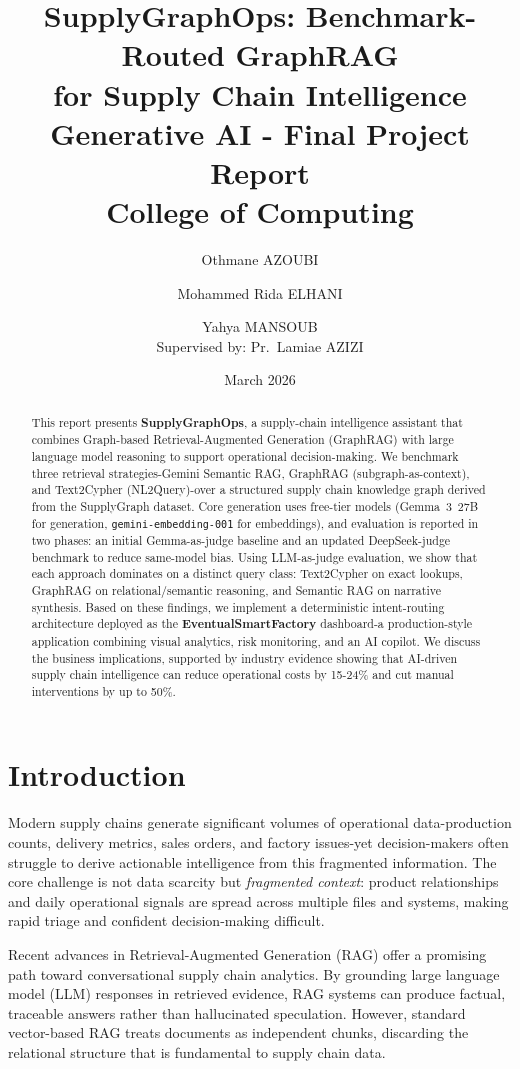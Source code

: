 \documentclass[11pt,a4paper]{article}
\title{
  \textbf{SupplyGraphOps: Benchmark-Routed GraphRAG\\for Supply Chain Intelligence}\\[6pt]
  \large Generative AI - Final Project Report\\
  College of Computing
}
\author{
  Othmane AZOUBI \and Mohammed Rida ELHANI \and Yahya MANSOUB\\[6pt]
  \normalsize Supervised by: Pr.\ Lamiae AZIZI
}
\date{March 2026}
\begin{document}
\maketitle
\thispagestyle{fancy}

\begin{abstract}
This report presents \textbf{SupplyGraphOps}, a supply-chain intelligence assistant that combines Graph-based Retrieval-Augmented Generation (GraphRAG) with large language model reasoning to support operational decision-making. We benchmark three retrieval strategies-Gemini Semantic RAG, GraphRAG (subgraph-as-context), and Text2Cypher (NL2Query)-over a structured supply chain knowledge graph derived from the SupplyGraph dataset. Core generation uses free-tier models (Gemma~3~27B for generation, \texttt{gemini-embedding-001} for embeddings), and evaluation is reported in two phases: an initial Gemma-as-judge baseline and an updated DeepSeek-judge benchmark to reduce same-model bias. Using LLM-as-judge evaluation, we show that each approach dominates on a distinct query class: Text2Cypher on exact lookups, GraphRAG on relational/semantic reasoning, and Semantic RAG on narrative synthesis. Based on these findings, we implement a deterministic intent-routing architecture deployed as the \textbf{EventualSmartFactory} dashboard-a production-style application combining visual analytics, risk monitoring, and an AI copilot. We discuss the business implications, supported by industry evidence showing that AI-driven supply chain intelligence can reduce operational costs by 15-24\% and cut manual interventions by up to 50\%.
\end{abstract}

\section{Introduction}

Modern supply chains generate significant volumes of operational data-production counts, delivery metrics, sales orders, and factory issues-yet decision-makers often struggle to derive actionable intelligence from this fragmented information. The core challenge is not data scarcity but \textit{fragmented context}: product relationships and daily operational signals are spread across multiple files and systems, making rapid triage and confident decision-making difficult.

Recent advances in Retrieval-Augmented Generation (RAG) offer a promising path toward conversational supply chain analytics. By grounding large language model (LLM) responses in retrieved evidence, RAG systems can produce factual, traceable answers rather than hallucinated speculation. However, standard vector-based RAG treats documents as independent chunks, discarding the relational structure that is fundamental to supply chain data.
\end{document}
